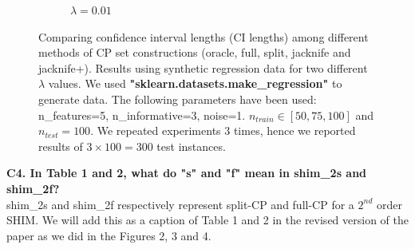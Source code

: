 \documentclass{article}
\begin{document}
\begin{figure}[h!]
\begin{subfigure}{0.4\textwidth}
     \caption{$\lambda=0.01$}
    \label{fig:jacknife2}
\end{subfigure}
\caption{Comparing confidence interval lengths (CI lengths) among different methods of CP set constructions (oracle, full, split, jacknife and jacknife+). Results using synthetic regression data for two different $\lambda$ values. We used \textbf{"sklearn.datasets.make\_regression"} to generate data. The following parameters have been used: n\_features=5, n\_informative=3, noise=1. $n_{train} \in [50, 75, 100]$ and $n_{test} = 100$. We repeated experiments $3$ times, hence we reported results of $3 \times 100 = 300$ test instances.}
\end{figure}

\textbf{C4. In Table 1 and 2, what do "s" and "f" mean in shim\_{2s} and shim\_{2f}?}\\

shim\_{2s} and shim\_{2f} respectively represent split-CP and full-CP for a $2^{nd}$ order SHIM. We will add this as a caption of Table 1 and 2 in the revised version of the paper as we did in the Figures 2, 3 and 4.\\
\end{document}
